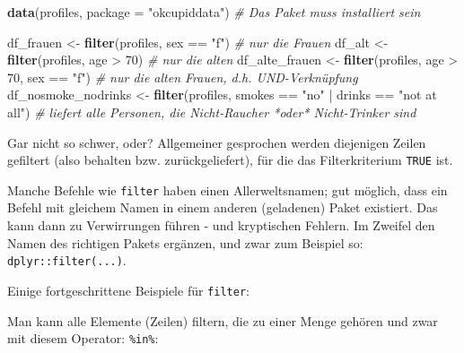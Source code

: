 \documentclass[12pt,]{book}
\makeatletter
\newenvironment{Shaded}{\begin{snugshade}}{\end{snugshade}}
\newcommand{\KeywordTok}[1]{\textcolor[rgb]{0.13,0.29,0.53}{\textbf{{#1}}}}
\newcommand{\DataTypeTok}[1]{\textcolor[rgb]{0.13,0.29,0.53}{{#1}}}
\newcommand{\DecValTok}[1]{\textcolor[rgb]{0.00,0.00,0.81}{{#1}}}
\newcommand{\StringTok}[1]{\textcolor[rgb]{0.31,0.60,0.02}{{#1}}}
\newcommand{\CommentTok}[1]{\textcolor[rgb]{0.56,0.35,0.01}{\textit{{#1}}}}
\newcommand{\NormalTok}[1]{{#1}}
\newenvironment{kframe}{%
\medskip{}
\setlength{\fboxsep}{.8em}
 \def\at@end@of@kframe{}%
 \ifinner\ifhmode%
  \def\at@end@of@kframe{\end{minipage}}%
  \begin{minipage}{\columnwidth}%
 \fi\fi%
 \def\FrameCommand##1{\hskip\@totalleftmargin \hskip-\fboxsep
 \colorbox{shadecolor}{##1}\hskip-\fboxsep
     \hskip-\linewidth \hskip-\@totalleftmargin \hskip\columnwidth}%
 \MakeFramed {\advance\hsize-\width
   \@totalleftmargin\z@ \linewidth\hsize
   \@setminipage}}%
 {\par\unskip\endMakeFramed%
 \at@end@of@kframe}
\renewenvironment{Shaded}{\begin{kframe}}{\end{kframe}}
\let\BeginKnitrBlock\begin \let\EndKnitrBlock\end
\makeatother
\begin{document}
\begin{Shaded}
\begin{Highlighting}[]
\KeywordTok{data}\NormalTok{(profiles, }\DataTypeTok{package =} \StringTok{"okcupiddata"}\NormalTok{)  }\CommentTok{# Das Paket muss installiert sein}
\end{Highlighting}
\end{Shaded}

\begin{Shaded}
\begin{Highlighting}[]
\NormalTok{df_frauen <-}\StringTok{ }\KeywordTok{filter}\NormalTok{(profiles, sex ==}\StringTok{ "f"}\NormalTok{)  }\CommentTok{# nur die Frauen}
\NormalTok{df_alt <-}\StringTok{ }\KeywordTok{filter}\NormalTok{(profiles, age >}\StringTok{ }\DecValTok{70}\NormalTok{)  }\CommentTok{# nur die alten}
\NormalTok{df_alte_frauen <-}\StringTok{ }\KeywordTok{filter}\NormalTok{(profiles, age >}\StringTok{ }\DecValTok{70}\NormalTok{, sex ==}\StringTok{ "f"}\NormalTok{)  }\CommentTok{# nur die alten Frauen, d.h. UND-Verknüpfung}
\NormalTok{df_nosmoke_nodrinks <-}\StringTok{ }\KeywordTok{filter}\NormalTok{(profiles, smokes ==}\StringTok{ "no"} \NormalTok{|}\StringTok{ }\NormalTok{drinks ==}\StringTok{ "not at all"}\NormalTok{) }
\CommentTok{# liefert alle Personen, die Nicht-Raucher *oder* Nicht-Trinker sind}
\end{Highlighting}
\end{Shaded}

Gar nicht so schwer, oder? Allgemeiner gesprochen werden diejenigen
Zeilen gefiltert (also behalten bzw. zurückgeliefert), für die das
Filterkriterium \texttt{TRUE} ist.

\BeginKnitrBlock{rmdcaution}
Manche Befehle wie \texttt{filter} haben einen Allerweltsnamen; gut
möglich, dass ein Befehl mit gleichem Namen in einem anderen (geladenen)
Paket existiert. Das kann dann zu Verwirrungen führen - und kryptischen
Fehlern. Im Zweifel den Namen des richtigen Pakets ergänzen, und zwar
zum Beispiel so: \texttt{dplyr::filter(...)}.
\EndKnitrBlock{rmdcaution}

Einige fortgeschrittene Beispiele für \texttt{filter}:

Man kann alle Elemente (Zeilen) filtern, die zu einer Menge gehören und
zwar mit diesem Operator: \texttt{\%in\%}:

\begin{Shaded}
\end{Shaded}
\end{document}

